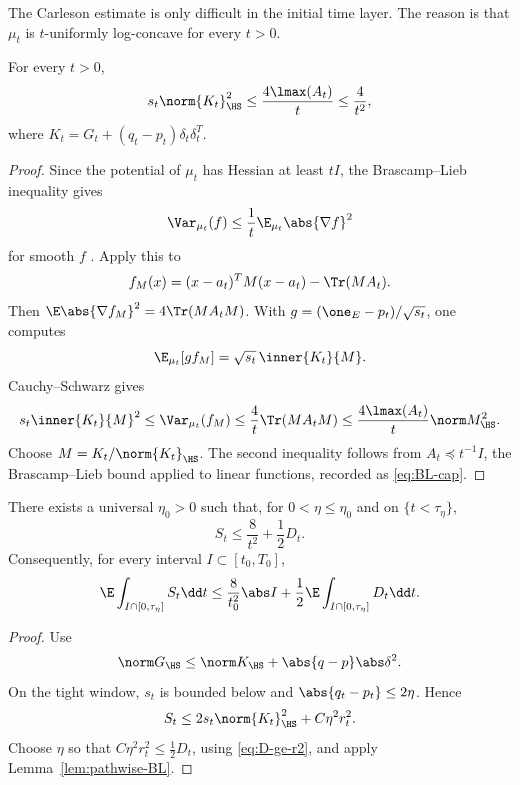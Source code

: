 \documentclass[../../main.tex]{subfiles}
\begin{document}
The Carleson estimate is only difficult in the initial time layer. The reason is that $\mu_t$ is
$t$-uniformly log-concave for every $t>0$.

\begin{lemma}
\label{lem:pathwise-BL}
For every $t>0$,
\begin{equation}\label{eq:BL-source}
  s_t\norm{K_t}_{\HS}^2
  \le \frac{4\lmax(A_t)}{t}
  \le \frac4{t^2},
\end{equation}
where $K_t=G_t+(q_t-p_t)\delta_t\delta_t^T$.
\end{lemma}

\begin{proof}
Since the potential of $\mu_t$ has Hessian at least $tI$, the Brascamp--Lieb inequality gives
\[
  \Var_{\mu_t}(f)\le\frac1t\E_{\mu_t}\abs{\nabla f}^2
\]
for smooth $f$ \cite{BrascampLieb1976}. Apply this to
\[
  f_M(x)=(x-a_t)^TM(x-a_t)-\Tr(MA_t).
\]
Then $\E\abs{\nabla f_M}^2=4\Tr(MA_tM)$. With
$g=(\one_E-p_t)/\sqrt{s_t}$, one computes
\[
  \E_{\mu_t}[g f_M]=\sqrt{s_t}\,\inner{K_t}{M}.
\]
Cauchy--Schwarz gives
\[
  s_t\inner{K_t}{M}^2
  \le \Var_{\mu_t}(f_M)
  \le\frac4t\Tr(MA_tM)
  \le\frac{4\lmax(A_t)}t\norm M_{\HS}^2 .
\]
Choose $M=K_t/\norm{K_t}_{\HS}$. The second inequality follows from $A_t\preceq t^{-1}I$, the
Brascamp--Lieb bound applied to linear functions, recorded as \eqref{eq:BL-cap}.
\end{proof}

\begin{corollary}
\label{cor:away-from-zero}
There exists a universal $\eta_0>0$ such that, for $0<\eta\le\eta_0$ and on $\{t<\tau_\eta\}$,
\begin{equation}\label{eq:away-source}
  S_t\le\frac8{t^2}+\frac12D_t .
\end{equation}
Consequently, for every interval $I\subset[t_0,T_0]$,
\[
  \E\int_{I\cap[0,\tau_\eta]}S_t\dd t
  \le \frac8{t_0^2}\abs I+\frac12\E\int_{I\cap[0,\tau_\eta]}D_t\dd t .
\]
\end{corollary}

\begin{proof}
Use
\[
  \norm G_{\HS}\le\norm K_{\HS}+\abs{q-p}\abs\delta^2.
\]
On the tight window, $s_t$ is bounded below and $\abs{q_t-p_t}\le2\eta$. Hence
\[
  S_t\le2s_t\norm{K_t}_{\HS}^2+C\eta^2r_t^2.
\]
Choose $\eta$ so that $C\eta^2r_t^2\le\frac12D_t$, using \eqref{eq:D-ge-r2}, and apply
Lemma~\ref{lem:pathwise-BL}.
\end{proof}
\end{document}

